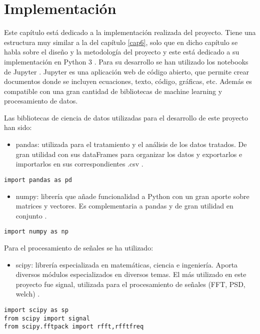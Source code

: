 \chapter{Implementación}
Este capítulo está dedicado a la implementación realizada del proyecto. Tiene una estructura muy similar a la del capítulo \ref{cap6}, solo que en dicho capítulo se habla sobre el diseño y la metodología del proyecto y este está dedicado a su implementación en Python 3 \cite{python}.
Para su desarrollo se han utilizado los notebooks de Jupyter \cite{jupyter}. Jupyter es una aplicación web de código abierto, que permite crear documentos donde se incluyen ecuaciones, texto, código, gráficas, etc. Además es compatible con una gran cantidad de bibliotecas de machine learning y procesamiento de datos.

Las bibliotecas de ciencia de datos utilizadas para el desarrollo de este proyecto han sido:
\begin{itemize}
\item pandas: utilizada para el tratamiento y el análisis de los datos tratados. De gran utilidad con sus dataFrames para organizar los datos y exportarlos e importarlos en sus correspondientes .csv \cite{pandas}.
\end{itemize}
\begin{lstlisting}
import pandas as pd
\end{lstlisting}

\begin{itemize}
\item numpy: librería que añade funcionalidad a Python con un gran aporte sobre matrices y vectores. Es complementaria a pandas y de gran utilidad en conjunto \cite{numpy}.
\end{itemize}
\begin{lstlisting}
import numpy as np
\end{lstlisting}


Para el procesamiento de señales se ha utilizado:
\begin{itemize}
\item scipy: librería especializada en matemáticas, ciencia e ingeniería. Aporta diversos módulos especializados en diversos temas. El más utilizado en este proyecto fue signal, utilizada para el procesamiento de señales (FFT, PSD, welch) \cite{scipy,scipysignal}.
\end{itemize}

\begin{lstlisting}
import scipy as sp
from scipy import signal
from scipy.fftpack import rfft,rfftfreq
\end{lstlisting}

